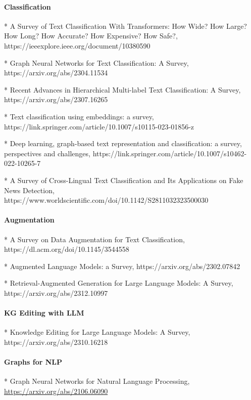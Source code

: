\paragraph{Classification}

* A Survey of Text Classification With Transformers: How Wide? How Large? How Long? How Accurate? How Expensive? How Safe?, https://ieeexplore.ieee.org/document/10380590

* Graph Neural Networks for Text Classification: A Survey, https://arxiv.org/abs/2304.11534

* Recent Advances in Hierarchical Multi-label Text Classification: A Survey, https://arxiv.org/abs/2307.16265

* Text classification using embeddings: a survey, https://link.springer.com/article/10.1007/s10115-023-01856-z

* Deep learning, graph-based text representation and classification: a survey, perspectives and challenges, https://link.springer.com/article/10.1007/s10462-022-10265-7

* A Survey of Cross-Lingual Text Classification and Its Applications on Fake News Detection, https://www.worldscientific.com/doi/10.1142/S2811032323500030

\paragraph{Augmentation}

* A Survey on Data Augmentation for Text Classification, https://dl.acm.org/doi/10.1145/3544558

* Augmented Language Models: a Survey, https://arxiv.org/abs/2302.07842

* Retrieval-Augmented Generation for Large Language Models: A Survey, https://arxiv.org/abs/2312.10997
 
\paragraph{KG Editing with LLM}

* Knowledge Editing for Large Language Models: A Survey, https://arxiv.org/abs/2310.16218

\paragraph{Graphs for NLP}

* Graph Neural Networks for Natural Language Processing, \url{https://arxiv.org/abs/2106.06090}

